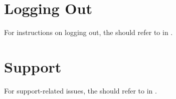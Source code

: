 \chapter{Logging Out} \label{chap:admin-logout}

\rolecontent{\role}
{%
	
}
{} %
{%
	For instructions on logging out, the \admin should refer to  in \userpart. 
}


\chapter{Support} \label{chap:admin-support}

\rolecontent{\role}
{%
	
}
{} %
{%
	For support-related issues, the \admin should refer to  in \userpart.
}


